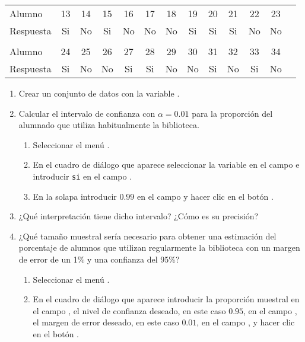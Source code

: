 \begin{enumerate}[leftmargin=*]
\begin{center}
\begin{tabular}{lcccccccccccc}
\hline
Alumno    & 13 & 14 & 15 & 16 & 17 & 18 & 19 & 20 & 21 & 22 & 23 \\
Respuesta & Si  & No  & Si  & No  & No  & No  & Si  & Si  & Si  & No  & No  \\
\hline\\
\hline
Alumno 	  & 24 & 25 & 26 & 27 & 28 & 29 & 30 & 31 & 32 & 33 & 34 \\
Respuesta & Si & No & No & Si & Si & No & No & Si & No & Si & No \\
\hline
\end{tabular}
\end{center}

\begin{enumerate}
\item Crear un conjunto de datos con la variable .
\item Calcular el intervalo de confianza con $\alpha=0.01$ para la proporción del alumnado que utiliza habitualmente la biblioteca. 
\begin{indicacion}
\begin{enumerate}
\item Seleccionar el menú .
\item En el cuadro de diálogo que aparece seleccionar la variable  en el campo  e
introducir \texttt{si} en el campo .
\item En la solapa  introducir $0.99$ en el campo  y hacer clic en
el botón .
\end{enumerate}
\end{indicacion}

\item ¿Qué interpretación tiene dicho intervalo? ¿Cómo es su precisión?

\item ¿Qué tamaño muestral sería necesario para obtener una estimación del porcentaje de alumnos que utilizan regularmente la biblioteca 
con un margen de error de un 1\% y una confianza del 95\%? 
\begin{indicacion}
\begin{enumerate}
\item Seleccionar el menú .
\item En el cuadro de diálogo que aparece introducir la proporción muestral en el campo , el nivel de confianza
deseado, en este caso $0.95$, en el campo , el margen de error deseado, en este caso
$0.01$, en el campo , y hacer clic en el botón .
\end{enumerate}
\end{indicacion}
\end{enumerate}




\end{enumerate}
